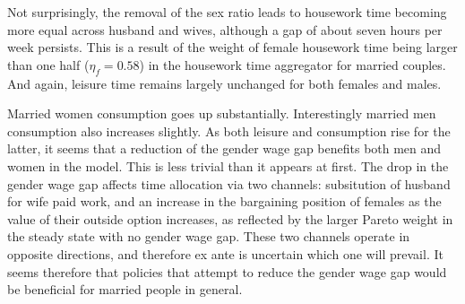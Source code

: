 \documentclass[12pt]{article}
\begin{document}
Not surprisingly, the removal of the sex ratio leads to housework time becoming more equal across husband and wives, although a gap of about seven hours per week persists. This is a result of the weight of female housework time being larger than one half ($\eta_f=0.58$) in the housework time aggregator for married couples. And again, leisure time remains largely unchanged for both females and males. 

Married women consumption goes up substantially. Interestingly married men consumption also increases slightly. As both leisure and consumption rise for the latter, it seems that a reduction of the gender wage gap benefits both men and women in the model. This is less trivial than it appears at first. The drop in the gender wage gap affects time allocation via two channels: subsitution of husband for wife paid work, and an increase in the bargaining position of females as the value of their outside option increases, as reflected by the larger Pareto weight in the steady state with no gender wage gap. These two channels operate in opposite directions, and therefore ex ante is uncertain which one will prevail. It seems therefore that policies that attempt to reduce the gender wage gap would be beneficial for married people in general.  
\end{document}
